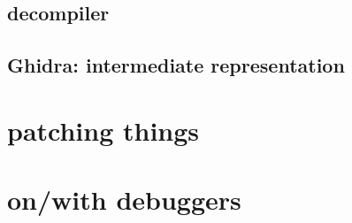 \subsection{decompiler}


\subsection{Ghidra: intermediate representation}


\section{patching things}


\section{on/with debuggers}


